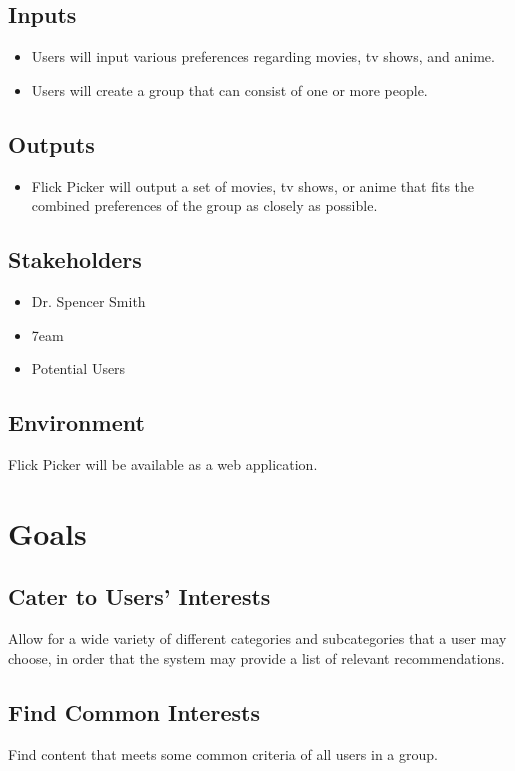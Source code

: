 \documentclass{article}
\begin{document}
\subsection{Inputs}
\begin{itemize}
	\item Users will input various preferences regarding movies, tv shows, and anime. 
	\item Users will create a group that can consist of one or more people.
\end{itemize}

\subsection{Outputs}
\begin{itemize}
	\item Flick Picker will output a set of movies, tv shows, or anime that fits the combined preferences of the group as closely as possible.
\end{itemize}

\subsection{Stakeholders}

\begin{itemize}
	\item Dr. Spencer Smith
	\item 7eam
	\item Potential Users
\end{itemize}

\subsection{Environment}

Flick Picker will be available as a web application.

\section{Goals}

\subsection{Cater to Users' Interests}
Allow for a wide variety of different categories and subcategories that a user may choose, in order that the system may provide a list of relevant recommendations.

\subsection{Find Common Interests}
Find content that meets some common criteria of all users in a group.
\end{document}
